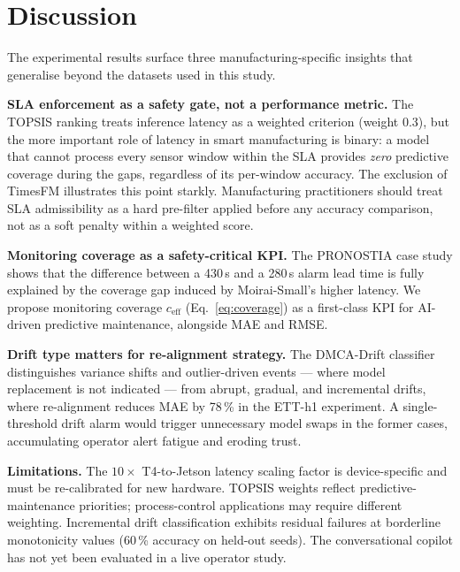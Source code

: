 \documentclass[12pt,a4paper]{article}
\begin{document}
\section{Discussion}
\label{sec:discussion}

The experimental results surface three manufacturing-specific insights
that generalise beyond the datasets used in this study.

\textbf{SLA enforcement as a safety gate, not a performance metric.}
The TOPSIS ranking treats inference latency as a weighted criterion
(weight 0.3), but the more important role of latency in smart
manufacturing is binary: a model that cannot process every sensor
window within the SLA provides \emph{zero} predictive coverage
during the gaps, regardless of its per-window accuracy.
The exclusion of TimesFM illustrates this point starkly.
Manufacturing practitioners should treat SLA admissibility as a
hard pre-filter applied before any accuracy comparison, not as a
soft penalty within a weighted score.

\textbf{Monitoring coverage as a safety-critical KPI.}
The PRONOSTIA case study shows that the difference between a 430\,s
and a 280\,s alarm lead time is fully explained by the coverage
gap induced by Moirai-Small's higher latency.
We propose monitoring coverage $c_\text{eff}$ (Eq.~\ref{eq:coverage})
as a first-class KPI for AI-driven predictive maintenance,
alongside MAE and RMSE.

\textbf{Drift type matters for re-alignment strategy.}
The DMCA-Drift classifier distinguishes variance shifts and
outlier-driven events --- where model replacement is not indicated
--- from abrupt, gradual, and incremental drifts, where
re-alignment reduces MAE by 78\,\% in the ETT-h1 experiment.
A single-threshold drift alarm would trigger unnecessary model swaps
in the former cases, accumulating operator alert fatigue and
eroding trust.

\textbf{Limitations.}
The $10\times$ T4-to-Jetson latency scaling factor is
device-specific and must be re-calibrated for new hardware.
TOPSIS weights reflect predictive-maintenance priorities;
process-control applications may require different weighting.
Incremental drift classification exhibits residual failures at
borderline monotonicity values (60\,\% accuracy on held-out seeds).
The conversational copilot has not yet been evaluated in a live
operator study.
\end{document}
